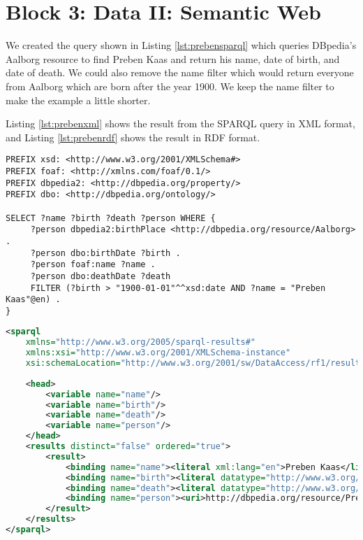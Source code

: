 \section*{Block 3: Data II: Semantic Web}

We created the query shown in Listing \ref{lst:prebensparql} which queries DBpedia's Aalborg resource to find Preben Kaas and return his name, date of birth, and date of death. We could also remove the name filter which would return everyone from Aalborg which are born after the year 1900. We keep the name filter to make the example a little shorter.

Listing \ref{lst:prebenxml} shows the result from the SPARQL query in XML format, and Listing \ref{lst:prebenrdf} shows the result in RDF format.\\

\begin{lstlisting}[language=sparql, caption={SPARQL query}, label=lst:prebensparql] 
PREFIX xsd: <http://www.w3.org/2001/XMLSchema#>
PREFIX foaf: <http://xmlns.com/foaf/0.1/>
PREFIX dbpedia2: <http://dbpedia.org/property/>
PREFIX dbo: <http://dbpedia.org/ontology/>

SELECT ?name ?birth ?death ?person WHERE {
     ?person dbpedia2:birthPlace <http://dbpedia.org/resource/Aalborg> .
     ?person dbo:birthDate ?birth .
     ?person foaf:name ?name .
     ?person dbo:deathDate ?death
     FILTER (?birth > "1900-01-01"^^xsd:date AND ?name = "Preben Kaas"@en) .
}
\end{lstlisting}

\begin{lstlisting}[language=xml,label=lst:prebenxml, caption={XML from SPARQL query}] 
<sparql
    xmlns="http://www.w3.org/2005/sparql-results#"
    xmlns:xsi="http://www.w3.org/2001/XMLSchema-instance"
    xsi:schemaLocation="http://www.w3.org/2001/sw/DataAccess/rf1/result2.xsd">
    
    <head>
        <variable name="name"/>
        <variable name="birth"/>
        <variable name="death"/>
        <variable name="person"/>
    </head>
    <results distinct="false" ordered="true">
        <result>
            <binding name="name"><literal xml:lang="en">Preben Kaas</literal></binding>
            <binding name="birth"><literal datatype="http://www.w3.org/2001/XMLSchema#date">1930-03-30</literal></binding>
            <binding name="death"><literal datatype="http://www.w3.org/2001/XMLSchema#date">1981-03-27</literal></binding>
            <binding name="person"><uri>http://dbpedia.org/resource/Preben_Kaas</uri></binding>
        </result>
    </results>
</sparql>
\end{lstlisting}

